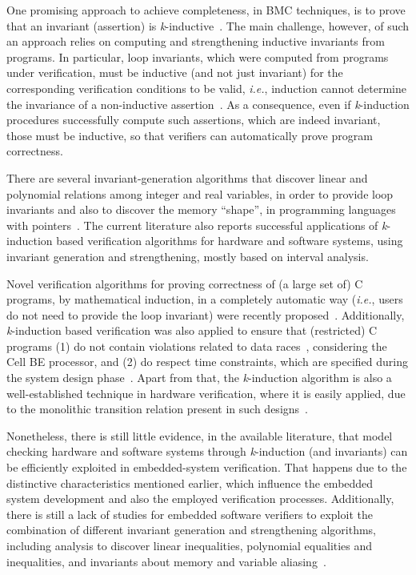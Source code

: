 \documentclass{acm_sen_article}
\begin{document}
One promising approach to achieve completeness, in BMC techniques, is to prove that an invariant (assertion) is \textit{k}-inductive~\cite{EenS03,Sheera00}. The main challenge, however, of such an approach relies on computing and strengthening inductive invariants from programs. In particular, loop invariants, which were computed from programs under verification, must be inductive (and not just invariant) for the corresponding verification conditions to be valid, {\it i.e.}, induction cannot determine the invariance of a non-inductive assertion~\cite{Bradley07}. As a consequence, even if \textit{k}-induction procedures successfully compute such assertions, which are indeed invariant, those must be inductive, so that verifiers can automatically prove program correctness.

There are several invariant-generation algorithms that discover linear and polynomial relations among integer and real variables, in order to provide loop invariants and also to discover the memory ``shape'', in programming languages with pointers~\cite{pips:2013,Henry:2012}. The current literature also reports successful applications of \textit{k}-induction based verification algorithms for hardware and software systems, using invariant generation and strengthening, mostly based on interval analysis. 

Novel verification algorithms for proving correctness of (a large set of) C programs, by mathematical induction, in a completely automatic way ({\it i.e.}, users do not need to provide the loop invariant) were recently proposed~\cite{Gadelha15,Beyer15,Brain15,Rocha15,Kinductor,Rocha17}. Additionally, \textit{k}-induction based verification was also applied to ensure that (restricted) C programs (1) do not contain violations related to data races~\cite{Donaldson10}, considering the Cell BE processor, and (2) do respect time constraints, which are specified during the system design phase~\cite{EenS03}. Apart from that, the \textit{k}-induction algorithm is also a well-established technique in hardware verification, where it is easily applied, due to the monolithic transition relation present in such designs~\cite{EenS03,Sheera00,GrosseLD09}. 

Nonetheless, there is still little evidence, in the available literature, that model checking hardware and software systems through \textit{k}-induction (and invariants) can be efficiently exploited in embedded-system verification. That happens due to the distinctive characteristics mentioned earlier, which influence the embedded system development and also the employed verification processes. Additionally, there is still a lack of studies for embedded software verifiers to exploit the combination of different invariant generation and strengthening algorithms, including analysis to discover linear inequalities, polynomial equalities and inequalities, and invariants about memory and variable aliasing~\cite{Bradley07}.
\end{document}
